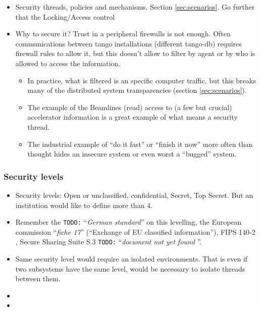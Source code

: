 \documentclass[10pt,a4paper,twoside]{llncs}
\newcommand{\todo}[1]{\texttt{\color{red}TODO:} ``\emph{#1}''}
\begin{document}
\begin{itemize}
    \item Security threads, policies and mechanisms. Section \ref{sec:scenarios}. Go further that the Locking/Access control
    \item Why to secure it? Trust in a peripheral firewalls is not enough. Often communications between tango installations (different tango-db) requires firewall rules to allow it, but this doesn't allow to filter by agent or by who is allowed to access the information.
    \begin{itemize}
        \item In practice, what is filtered is an specific computer traffic, but this breaks many of the distributed system transparencies (section \ref{sec:scenarios}).
        \item The example of the Beamlines (read) access to (a few but crucial) accelerator information is a great example of what means a security thread.
        \item The industrial example of ``do it fast'' or ``finish it now'' more often than thought hides an insecure system or even worst a ``bugged'' system. 
    \end{itemize}
\end{itemize}


\subsubsection{Security levels \label{sec:secLevel}}

\begin{itemize}
    \item Security levels: Open or unclassified, confidential, Secret, Top Secret. But an institution would like to define more than 4.
    \item Remember the \todo{German standard} on this levelling, the European commission ``\emph{fiche 17}'' \cite{fiche17EU}(``Exchange of EU classified information''), FIPS 140-2 \cite{NIST140-2}, Secure Sharing Suite S.3 \todo{document not yet found \cite{}}.
    \item Same security level would require an isolated environments. That is even if two subsystems have the same level, would be necessary to isolate threads between them.
    \item
    \item
\end{itemize}


\end{document}
